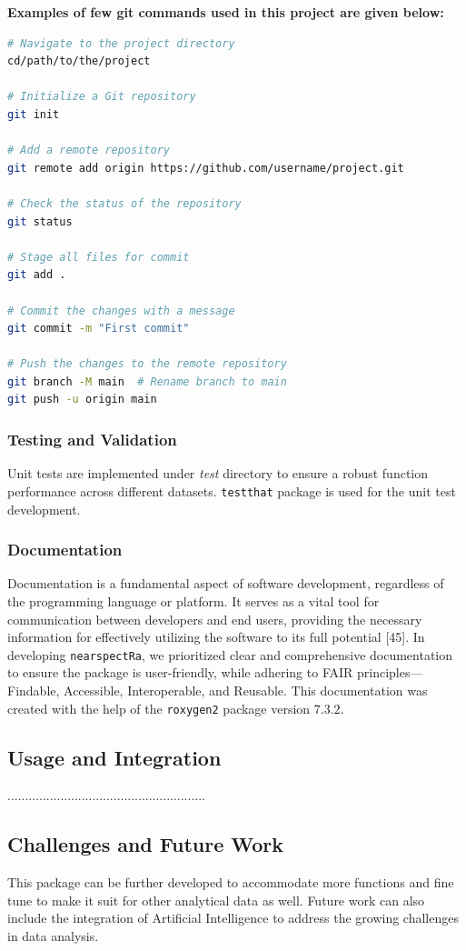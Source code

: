 \documentclass[12pt,a4paper]{report}
\begin{document}
\textbf{Examples of few git commands used in this project are given below:}
\begin{lstlisting}[language=bash, style=mystyle]
# Navigate to the project directory
cd/path/to/the/project

# Initialize a Git repository
git init

# Add a remote repository
git remote add origin https://github.com/username/project.git

# Check the status of the repository
git status

# Stage all files for commit
git add .

# Commit the changes with a message
git commit -m "First commit"

# Push the changes to the remote repository
git branch -M main  # Rename branch to main
git push -u origin main
\end{lstlisting}


\subsubsection*{Testing and Validation} 
Unit tests are implemented under \textit{test} directory to ensure a robust function performance across different datasets. \texttt{testthat} package is used for the unit test development.

\subsubsection*{Documentation} 
Documentation is a fundamental aspect of software development, regardless of the programming language or platform. It serves as a vital tool for communication between developers and end users, providing the necessary information for effectively utilizing the software to its full potential [45]. In developing \texttt{nearspectRa}, we prioritized clear and comprehensive documentation to ensure the package is user-friendly, while adhering to FAIR principles—Findable, Accessible, Interoperable, and Reusable. This documentation was created with the help of the \texttt{roxygen2} package version $7.3.2$.

\subsection{Usage and Integration}
 
........................................................

\subsection{Challenges and Future Work}
This package can be further developed to accommodate more functions and fine tune to make it suit for other analytical data as well. Future work can also include the integration of Artificial Intelligence to address the growing challenges in data analysis. 
\end{document}
